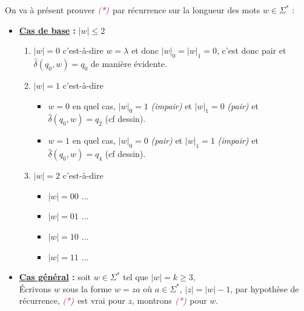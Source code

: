 \documentclass{article}
\newcommand{\term}[1]{\textit{\textcolor{maintitle}{#1}}}
\begin{document}
\begin{sffamily}
On va à présent prouver $\term{(*)}$ par récurrence sur la longueur des mots $w\in\Sigma^*$ :
\begin{itemize}
\item\textbf{\underline{Cas de base} :} $|w| \leq 2$
	\begin{enumerate}
		\item $|w| = 0$ c'est-à-dire $w = \lambda$ et donc $|w|_0 = |w|_1 = 0$, c'est donc pair et $\hat{\delta}(q_0,w) 
		= q_0$ de manière évidente.
		\item $|w| = 1$ c'est-à-dire 
			\begin{itemize}
			\item $w = 0$ en quel cas, $|w|_0 = 1$ \textit{(impair)} et $|w|_1 = 0$ \textit{(pair)} et $\hat{\delta}
			(q_0,w)= q_2$ (cf dessin).
			\item $w = 1$ en quel cas, $|w|_0 = 0$ \textit{(pair)} et $|w|_1 = 1$ \textit{(impair)} et $\hat{\delta}
			(q_0,w)= q_4$ (cf dessin).
			\end{itemize}
		\item $|w| = 2$ c'est-à-dire
			\begin{itemize}
			\item $|w|=00$ ...
			\item $|w|=01$ ...
			\item $|w|=10$ ...
			\item $|w|=11$ ...
			\end{itemize}
	\end{enumerate}
\item\textbf{\underline{Cas général} :} soit $w \in \Sigma^*$ tel que $|w| = k \geq 3$, \\

\noindent Écrivons $w$ sous la forme $w = z a$ où $a\in \Sigma^*$, $|z| = |w|-1$, par hypothèse de récurrence, 
$\term{(*)}$ est vrai pour $z$, montrons $\term{(*)}$ pour $w$.


\end{itemize}
\end{sffamily}
\end{document}
